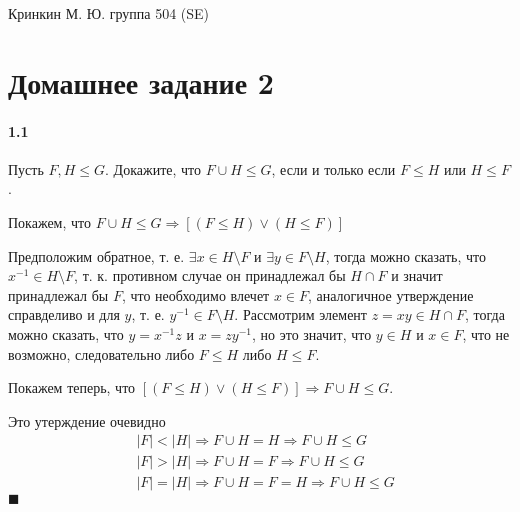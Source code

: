 \documentclass[a4paper,12pt]{article}
\begin{document}
\sloppy

\lstset{
	basicstyle=\small,
	stringstyle=\ttfamily,
	showstringspaces=false,
	columns=fixed,
	breaklines=true,
	numbers=right,
	numberstyle=\tiny
}

\newtheorem{Def}{Определение}[section]
\newtheorem{Th}{Теорема}
\newtheorem{Lem}[Th]{Лемма}
\newenvironment{Proof}
	{\par\noindent{\bf Доказательство.}}
	{\hfill$\scriptstyle\blacksquare$}
\newenvironment{Solution}
	{\par\noindent{\bf Решение.}}
	{\hfill$\scriptstyle\blacksquare$}


\begin{flushright}
	Кринкин М. Ю. группа 504 (SE)
\end{flushright}

\section{Домашнее задание 2}

\paragraph{1.1} Пусть $F,H \le G$. Докажите, что $F \cup H \le G$, если и только если $F \le H$ или $H \le F$.
\begin{Proof}
Покажем, что $F \cup H \le G \Rightarrow \left[\left(F \le H\right) \lor \left(H \le F\right)\right]$

Предположим обратное, т. е. $\exists x \in H \setminus F$ и $\exists y \in F \setminus H$, тогда можно сказать, что $x^{-1} \in H \setminus F$, т. к.  противном случае он принадлежал бы $H \cap F$ и значит принадлежал бы $F$, что необходимо влечет $x \in F$, аналогичное утверждение справделиво и для $y$, т. е. $y^{-1} \in F \setminus H$. Рассмотрим элемент $z = xy \in H \cap F$, тогда можно сказать, что $y = x^{-1} z$ и $x = z y^{-1}$, но это значит, что $y \in H$ и $x \in F$, что не возможно, следовательно либо $F \le H$ либо $H \le F$.

Покажем теперь, что $\left[\left(F \le H\right) \lor \left(H \le F\right)\right] \Rightarrow F \cup H \le G$.

Это утерждение очевидно
\[
	\begin{split}
		& \left|F\right| < \left|H\right| \Rightarrow F \cup H = H \Rightarrow F \cup H \le G \\
		& \left|F\right| > \left|H\right| \Rightarrow F \cup H = F \Rightarrow F \cup H \le G \\
		& \left|F\right| = \left|H\right| \Rightarrow F \cup H = F = H \Rightarrow F \cup H \le G
	\end{split}
\]
\end{Proof}
\end{document}
